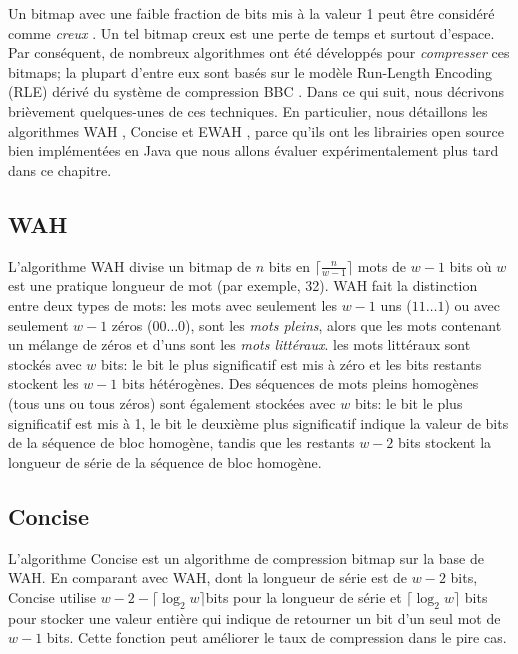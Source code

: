 Un bitmap avec une faible fraction de bits mis à la valeur 1 peut être considéré comme \emph{creux} \citep{lemire2014}. Un tel bitmap creux est une perte de temps et surtout d'espace. Par conséquent, de nombreux algorithmes ont été développés pour \emph{compresser} ces bitmaps; la plupart d'entre eux sont basés sur le modèle Run-Length Encoding (RLE) dérivé du système de compression BBC \citep{antoshenkov1995byte}. Dans ce qui suit, nous décrivons brièvement quelques-unes de ces techniques. En particulier, nous détaillons les algorithmes WAH \citep{wu2006optimizing}, Concise \citep{colantonio2010} et EWAH \citep{lemire2010}, parce qu'ils ont les librairies open source bien implémentées en Java que nous allons évaluer expérimentalement plus tard dans ce chapitre.

\subsection{WAH}

L'algorithme WAH \citep{wu2006optimizing} divise un bitmap de $n$ bits en $\lceil \frac{n}{w-1}\rceil$ mots de $w-1$ bits où $w$ est une pratique longueur de mot (par exemple, 32). WAH fait la distinction entre deux types de mots: les mots avec seulement les $w-1$ uns ($11\dots 1$) ou avec seulement $w-1$ zéros ($00\dots 0$), sont les \emph{mots pleins}, alors que les mots contenant un mélange de zéros et d'uns sont les \emph{mots littéraux}. les mots littéraux sont stockés avec $w$ bits: le bit le plus significatif est mis à zéro et les bits restants stockent les $w-1$ bits hétérogènes. Des séquences de mots pleins homogènes (tous uns ou tous zéros) sont également stockées avec $w$ bits: le bit le plus significatif est mis à 1, le bit le deuxième plus significatif indique la valeur de bits de la séquence de bloc homogène, tandis que les restants $w-2$ bits stockent la longueur de série de la séquence de bloc homogène.

\subsection{Concise}

L'algorithme Concise \citep{colantonio2010} est un algorithme de compression bitmap sur la base de WAH. En comparant avec WAH, dont la longueur de série est de $w-2$ bits, Concise utilise $w - 2 - \lceil \log_2 w \rceil$bits pour la longueur de série et $\lceil \log_2 w \rceil$ bits pour stocker une valeur entière qui indique de retourner un bit d'un seul mot de $w-1$ bits. Cette fonction peut améliorer le taux de compression dans le pire cas.

